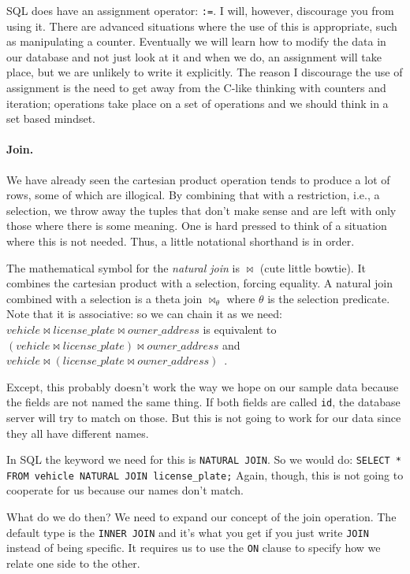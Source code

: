 SQL does have an assignment operator: \texttt{:=}. I will, however, discourage you from using it. There are advanced situations where the use of this is appropriate, such as manipulating a counter. Eventually we will learn how to modify the data in our database and not just look at it and when we do, an assignment will take place, but we are unlikely to write it explicitly. The reason I discourage the use of assignment is the need to get away from the C-like thinking with counters and iteration; operations take place on a set of operations and we should think in a set based mindset.

\paragraph{Join.} We have already seen the cartesian product operation tends to produce a lot of rows, some of which are illogical. By combining that with a restriction, i.e., a selection, we throw away the tuples that don't make sense and are left with only those where there is some meaning. One is hard pressed to think of a situation where this is not needed. Thus, a little notational shorthand is in order. 

The mathematical symbol for the \textit{natural join} is $\Join$ (cute little bowtie). It combines the cartesian product with a selection, forcing equality. A natural join combined with a selection is a theta join $\Join_{\theta}$ where $\theta$ is the selection predicate. Note that it is associative: so we can chain it as we need: $vehicle \Join license\_plate \Join owner\_address$ is equivalent to  $(vehicle \Join license\_plate) \Join owner\_address$  and $vehicle \Join (license\_plate \Join owner\_address)$~\cite{dsc}. 

Except, this probably doesn't work the way we hope on our sample data because the fields are not named the same thing. If both fields are called \texttt{id}, the database server will try to match on those. But this is not going to work for our data since they all have different names. 

In SQL the keyword we need for this is \texttt{NATURAL JOIN}. So we would do: \texttt{SELECT * FROM vehicle NATURAL JOIN license\_plate;} Again, though, this is not going to cooperate for us because our names don't match.

What do we do then? We need to expand our concept of the join operation. The default type is the \texttt{INNER JOIN} and it's what you get if you just write \texttt{JOIN} instead of being specific. It requires us to use the \texttt{ON} clause to specify how we relate one side to the other.

